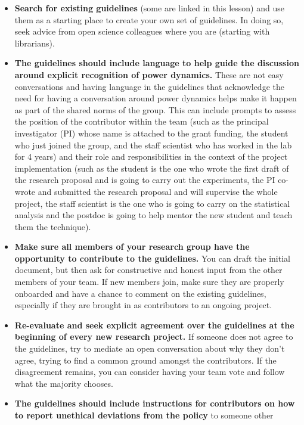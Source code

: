 \documentclass[
  letterpaper,
  DIV=11,
  numbers=noendperiod]{scrreport}
\providecommand{\tightlist}{%
  \setlength{\itemsep}{0pt}\setlength{\parskip}{0pt}}\usepackage{longtable,booktabs,array}
\begin{document}
\begin{itemize}
\tightlist
\item
  \textbf{Search for existing guidelines} (some are linked in this
  lesson) and use them as a starting place to create your own set of
  guidelines. In doing so, seek advice from open science colleagues
  where you are (starting with librarians).
\item
  \textbf{The guidelines should include language to help guide the
  discussion around explicit recognition of power dynamics.} These are
  not easy conversations and having language in the guidelines that
  acknowledge the need for having a conversation around power dynamics
  helps make it happen as part of the shared norms of the group. This
  can include prompts to assess the position of the contributor within
  the team (such as the principal investigator (PI) whose name is
  attached to the grant funding, the student who just joined the group,
  and the staff scientist who has worked in the lab for 4 years) and
  their role and responsibilities in the context of the project
  implementation (such as the student is the one who wrote the first
  draft of the research proposal and is going to carry out the
  experiments, the PI co-wrote and submitted the research proposal and
  will supervise the whole project, the staff scientist is the one who
  is going to carry on the statistical analysis and the postdoc is going
  to help mentor the new student and teach them the technique).
\item
  \textbf{Make sure all members of your research group have the
  opportunity to contribute to the guidelines.} You can draft the
  initial document, but then ask for constructive and honest input from
  the other members of your team. If new members join, make sure they
  are properly onboarded and have a chance to comment on the existing
  guidelines, especially if they are brought in as contributors to an
  ongoing project.
\item
  \textbf{Re-evaluate and seek explicit agreement over the guidelines at
  the beginning of every new research project.} If someone does not
  agree to the guidelines, try to mediate an open conversation about why
  they don't agree, trying to find a common ground amongst the
  contributors. If the disagreement remains, you can consider having
  your team vote and follow what the majority chooses.
\item
  \textbf{The guidelines should include instructions for contributors on
  how to report unethical deviations from the policy} to someone other

\end{itemize}
\end{document}
